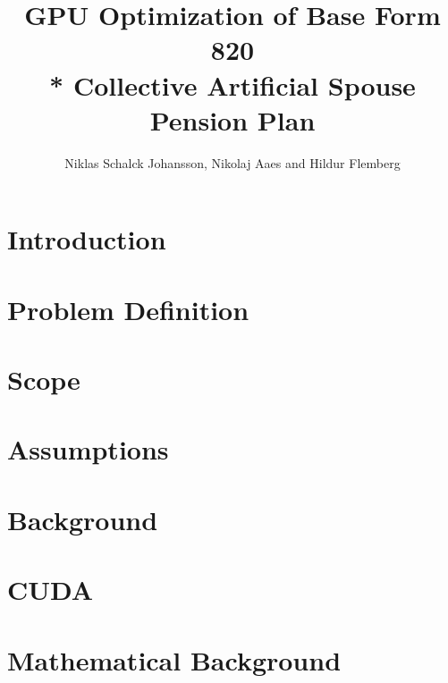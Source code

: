 \documentclass[oribibl]{llncs}
\title{GPU Optimization of Base Form 820 \\* Collective Artificial Spouse Pension Plan}
\author{Niklas Schalck Johansson, Nikolaj Aaes and Hildur Flemberg\\
\email{\{nsjo, niaa, hufl\}@itu.dk}}
\institute{IT University of Copenhagen}
\numberwithin{equation}{section}
\begin{document}
	\maketitle
	\tableofcontents
	\pagebreak
	
	
	\begin{abstract}
		
		\label{abstract}
	\end{abstract}
	
	\section{Introduction}
	
	\label{introduction}
	
	\section{Problem Definition}
	
	\label{problemdefinition}

	\section{Scope}
	
	\label{scope}

	\section{Assumptions}
	
	\label{assumptions}
		
	\section{Background}
	
	\label{background}
	
	\section{CUDA}
	
	\label{cuda}
	
	\section{Mathematical Background}
	
		
\end{document}
